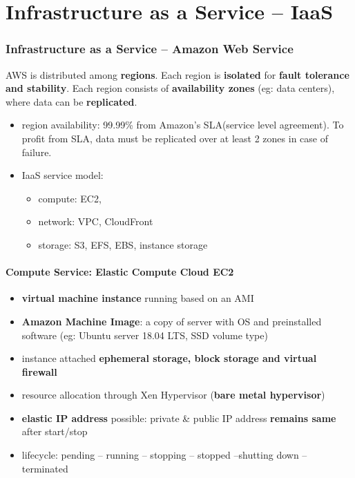
\part{Infrastructure as a Service -- IaaS}
\section{Infrastructure as a Service -- Amazon Web Service}

AWS is distributed among \textbf{regions}. Each region is \textbf{isolated} for \textbf{fault tolerance and stability}. Each region consists of \textbf{availability zones} (eg: data centers), where data can be \textbf{replicated}. 

\begin{itemize}
	\item region availability: 99.99\% from Amazon's SLA(service level agreement). To profit from SLA, data must be replicated over at least 2 zones in case of failure.
	\item IaaS service model:
	\begin{itemize}
		\item compute: EC2,
		\item network: VPC, CloudFront
		\item storage: S3, EFS, EBS, instance storage
	\end{itemize}
\end{itemize}

\subsection{Compute Service: Elastic Compute Cloud EC2}
\begin{itemize}
	\item \textbf{virtual machine instance} running based on an AMI
	\item \textbf{Amazon Machine Image}: a copy of server with OS and preinstalled software (eg: Ubuntu server 18.04 LTS, SSD volume type)
	\item instance attached \textbf{ephemeral storage, block storage and virtual firewall}
	\item resource allocation through Xen Hypervisor (\textbf{bare metal hypervisor}) 
	\item \textbf{elastic IP address} possible: private \& public IP address \textbf{remains same} after start/stop 
	\item lifecycle: pending -- running -- stopping -- stopped --shutting down -- terminated
\end{itemize}

